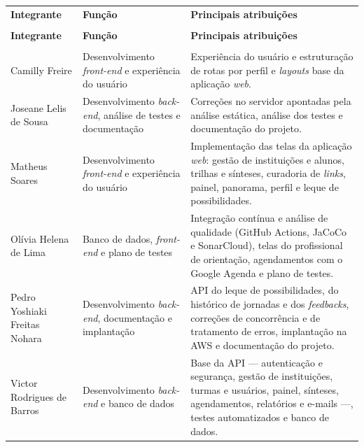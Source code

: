 {\ABNTEXfontereduzida
\renewcommand{\arraystretch}{1.25}
\begin{xltabular}{\textwidth}{|>{\raggedright\arraybackslash}p{4.5cm}|>{\raggedright\arraybackslash}p{3.9cm}|>{\raggedright\arraybackslash}X|}
 \\[0.3em]
\hline
\textbf{Integrante} & \textbf{Função} & \textbf{Principais atribuições} \\
\hline
\endfirsthead
{} \\
\hline
\textbf{Integrante} & \textbf{Função} & \textbf{Principais atribuições} \\
\hline
\endhead
{} \\
\endfoot
\endlastfoot
Camilly Freire & Desenvolvimento \textit{front-end} e experiência do usuário & Experiência do usuário e estruturação de rotas por perfil e \textit{layouts} base da aplicação \textit{web}. \\
\hline
Joseane Lelis de Sousa & Desenvolvimento \textit{back-end}, análise de testes e documentação & Correções no servidor apontadas pela análise estática, análise dos testes e documentação do projeto. \\
\hline
Matheus Soares & Desenvolvimento \textit{front-end} e experiência do usuário & Implementação das telas da aplicação \textit{web}: gestão de instituições e alunos, trilhas e sínteses, curadoria de \textit{links}, painel, panorama, perfil e leque de possibilidades. \\
\hline
Olívia Helena de Lima & Banco de dados, \textit{front-end} e plano de testes & Integração contínua e análise de qualidade (GitHub Actions, JaCoCo e SonarCloud), telas do profissional de orientação, agendamentos com o Google Agenda e plano de testes. \\
\hline
Pedro Yoshiaki Freitas Nohara & Desenvolvimento \textit{back-end}, documentação e implantação & API do leque de possibilidades, do histórico de jornadas e dos \textit{feedbacks}, correções de concorrência e de tratamento de erros, implantação na AWS e documentação do projeto. \\
\hline
Victor Rodrigues de Barros & Desenvolvimento \textit{back-end} e banco de dados & Base da API — autenticação e segurança, gestão de instituições, turmas e usuários, painel, sínteses, agendamentos, relatórios e e-mails —, testes automatizados e banco de dados. \\
\hline
\end{xltabular}
}

